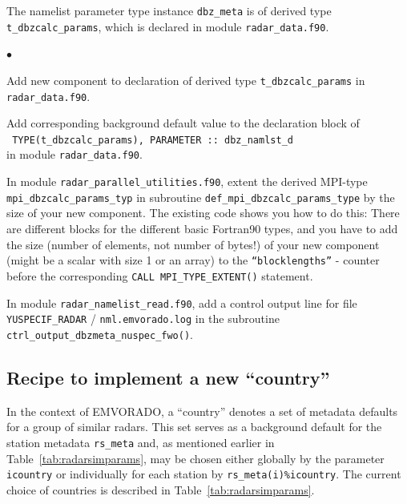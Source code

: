 \documentclass[10pt,a4paper,twoside,headinclude,footinclude,parskip=half]{scrartcl}
\newcommand{\myaktuellesection}{sec:intro}%
\newcommand{\labelsec}[1]{\label{#1}\renewcommand{\myaktuellesection}{#1}}%
\newcommand{\labelsec}[1]{\label{#1}}%
\newlength{\tmplena}%
\newenvironment{aufzaehlung}%
{\begin{list}{$\bullet$}{%
      \setlength{\labelwidth}{8mm}%
      \setlength{\leftmargin}{\labelwidth*\real{0.5}}%
      \setlength{\tmplena}{\itemsep}%
      \setlength{\itemsep}{0mm}%
}}{\setlength{\itemsep}{\tmplena}\end{list}}%
\newcommand{\srcform}[1]{\mbox{\texttt{#1}}\xspace}%
\begin{document}
The namelist parameter type instance \srcform{dbz_meta} is of derived type \srcform{t_dbzcalc_params}, which
is declared in module \srcform{radar_data.f90}.
\begin{aufzaehlung}
\item Add new component to declaration of derived type \srcform{t_dbzcalc_params} in \srcform{radar_data.f90}.
\item Add corresponding background default value to the declaration block of\\
  \srcform{ TYPE(t_dbzcalc_params), PARAMETER  :: dbz_namlst_d}\\
  in module \srcform{radar_data.f90}.
\item In module \srcform{radar_parallel_utilities.f90}, extent the derived MPI-type \srcform{mpi_dbzcalc_params_typ}
in subroutine \srcform{def_mpi_dbzcalc_params_type} by the size of your new component.
The existing code shows you how to do this: There are different blocks for the different
basic Fortran90 types, and you have to add the size (number of elements, not number of bytes!) of
your new component (might be a scalar with size 1 or an array) to the
\srcform{``blocklengths''} - counter before the corresponding \srcform{CALL MPI_TYPE_EXTENT()} statement.
\item In module \srcform{radar_namelist_read.f90}, add a control output line for file \srcform{YUSPECIF_RADAR} / \srcform{nml.emvorado.log} in the
subroutine \srcform{ctrl_output_dbzmeta_nuspec_fwo()}.
\end{aufzaehlung}

\subsection{Recipe to implement a new ``country''}

\labelsec{sec:devel:newcountry}

In the context of EMVORADO, a ``country'' denotes a set of metadata defaults for a group of similar radars.
This set serves as a background default for the station metadata \srcform{rs_meta} and, 
as mentioned earlier in Table~\ref{tab:radarsimparams}, may be chosen either globally by the parameter \srcform{icountry} or
individually for each station by \srcform{rs_meta(i)\%icountry}. The current choice of
countries is described in Table~\ref{tab:radarsimparams}.
\end{document}
